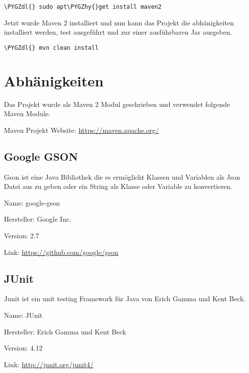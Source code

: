 \documentclass[letterpaper,10pt,ngerman]{sphinxmanual}
\def\PYGZdl{\char`\$}
\def\PYGZhy{\char`\-}
\begin{document}
\begin{Verbatim}[commandchars=\\\{\}]
\PYGZdl{} sudo apt\PYGZhy{}get install maven2
\end{Verbatim}

Jetzt wurde Maven 2 installiert und nun kann das Projekt die abhänigkeiten installiert werden, test ausgeführt und
zur einer ausführbaren Jar ausgeben.

\begin{Verbatim}[commandchars=\\\{\}]
\PYGZdl{} mvn clean install
\end{Verbatim}

\noindent{}


\section{Abhänigkeiten}
\label{intro:abhanigkeiten}
Das Projekt wurde als Maven 2 Modul geschrieben und verwendet folgende Maven Module.

Maven Projekt Website: \url{https://maven.apache.org/}


\subsection{Google GSON}
\label{intro:google-gson}
Gson ist eine Java Bibliothek die es ermöglicht Klassen und Variablen als Json Datei aus zu geben oder
ein String als Klasse oder Variable zu konvertieren.

\begin{DUlineblock}{0em}
\item[] Name: google-gson
\item[] Hersteller: Google Inc.
\item[] Version: 2.7
\item[] Link: \url{https://github.com/google/gson}
\end{DUlineblock}


\subsection{JUnit}
\label{intro:junit}
Junit ist ein unit testing Framework für Java von Erich Gamma und Kent Beck.

\begin{DUlineblock}{0em}
\item[] Name: JUnit
\item[] Hersteller: Erich Gamma und Kent Beck
\item[] Version: 4.12
\item[] Link: \url{http://junit.org/junit4/}
\end{DUlineblock}
\end{document}
